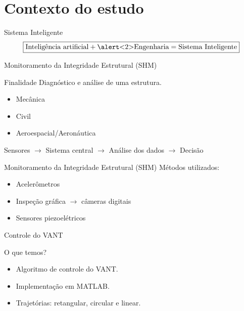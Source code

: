\section{Contexto do estudo}

\begin{frame}{Sistema Inteligente}
\[\boxed{\text{Inteligência artificial} + \text{\alert<2>{Engenharia}} = \text{Sistema Inteligente}}\]
\end{frame}
\begin{frame}{Monitoramento da Integridade Estrutural (SHM)}
\begin{block}{Finalidade}
    Diagnóstico e análise de uma estrutura.
\end{block} \pause
\vfill
\begin{itemize}
    \item Mecânica
    \item Civil
    \item Aeroespacial/Aeronáutica
\end{itemize} \pause
\vfill
Sensores \(\rightarrow\) Sistema central \(\rightarrow\) Análise dos dados \(\rightarrow\) Decisão
\end{frame}
\begin{frame}{Monitoramento da Integridade Estrutural (SHM)}
Métodos utilizados:
\begin{itemize}
    \item Acelerômetros
    \item Inspeção gráfica \(\rightarrow\) câmeras digitais
    \item \alert<2>{Sensores piezoelétricos}
\end{itemize}
\end{frame}
\begin{frame}{Controle do VANT}
\pause
\begin{block}{O que temos?}
    \begin{itemize}
        \item Algoritmo de controle do VANT.
        \item Implementação em MATLAB.
        \item Trajetórias: retangular, circular e linear.
    \end{itemize}
\end{block} \pause
\vfill
\begin{figure}
    \centering
    
    \end{figure}
\end{frame}

